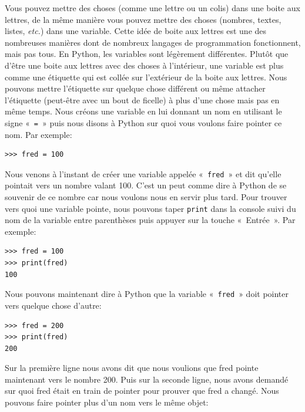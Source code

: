 Vous pouvez mettre des choses (comme une lettre ou un colis) dans une boite aux lettres, de la même manière vous pouvez mettre des choses (nombres, textes, listes, \emph{etc.}) dans une variable. Cette idée de boite aux lettres est une des nombreuses manières dont de nombreux langages de programmation fonctionnent, mais pas tous.
En Python, les variables sont légèrement différentes. Plutôt que d'être une boite aux lettres avec des choses à l'intérieur, une variable est plus comme une étiquette qui est collée sur l'extérieur de la boite aux lettres. Nous pouvons mettre l'étiquette sur quelque chose différent ou même attacher l'étiquette (peut-être avec un bout de ficelle) à plus d'une chose mais pas en même temps. Nous créons une variable en lui donnant un nom en utilisant le signe «~\texttt{=}~» puis nous disons à Python sur quoi vous voulons faire pointer ce nom. Par exemple:\\

\begin{Verbatim}[frame=single,rulecolor=\color{mbleu}, label=à taper]
>>> fred = 100
\end{Verbatim}

Nous venons à l'instant de créer une variable appelée «~\texttt{fred}~» et dit qu'elle pointait vers un nombre valant 100. C'est un peut comme dire à Python de se souvenir de ce nombre car nous voulons nous en servir plus tard. Pour trouver vers quoi une variable pointe, nous pouvons taper \texttt{print} dans la console suivi du nom de la variable entre parenthèses puis appuyer sur la touche «~Entrée~». Par exemple:

\begin{Verbatim}[frame=single,rulecolor=\color{mbleu}, label=à taper]
>>> fred = 100
>>> print(fred)
100
\end{Verbatim}

Nous pouvons maintenant dire à Python que la variable «~\texttt{fred}~» doit pointer vers quelque chose d'autre:

\begin{Verbatim}[frame=single,rulecolor=\color{mbleu}, label=à taper]
>>> fred = 200
>>> print(fred)
200
\end{Verbatim}

Sur la première ligne nous avons dit que nous voulions que fred pointe maintenant vers le nombre 200. Puis sur la seconde ligne, nous avons demandé sur quoi fred était en train de pointer pour prouver que fred a changé. Nous pouvons faire pointer plus d'un nom vers le même objet:

